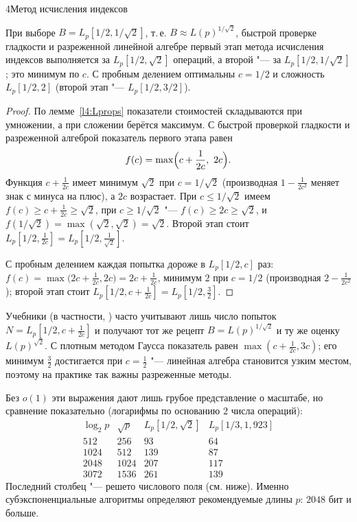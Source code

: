 \begin{lecture}{4}{Метод исчисления индексов}
\begin{theorem}\label{l4:complexity}
При выборе $B = L_p[1/2, 1/\sqrt2]$, т.\,е. $B \approx L(p)^{1/\sqrt 2}$, быстрой проверке
гладкости и разреженной линейной алгебре первый этап метода исчисления индексов выполняется за
$L_p[1/2, \sqrt 2]$ операций, а второй "--- за $L_p[1/2, 1/\sqrt2]$; это минимум по $c$.
С пробным делением оптимальны $c = 1/2$ и сложность $L_p[1/2, 2]$ (второй этап "---
$L_p[1/2, 3/2]$).
\end{theorem}

\begin{proof}
По лемме~\ref{l4:Lprops} показатели стоимостей складываются при умножении, а при сложении берётся
максимум. С быстрой проверкой гладкости и разреженной алгеброй показатель первого этапа равен
\[
  f(c) = \max\Bigl(c + \frac{1}{2c},\ 2c\Bigr).
\]
Функция $c + \frac{1}{2c}$ имеет минимум $\sqrt 2$ при $c = 1/\sqrt 2$ (производная $1 -
\frac{1}{2c^2}$ меняет знак с минуса на плюс), а $2c$ возрастает. При $c \le 1/\sqrt2$ имеем
$f(c) \ge c + \frac{1}{2c} \ge \sqrt2$, при $c \ge 1/\sqrt2$ "--- $f(c) \ge 2c \ge \sqrt 2$,
и $f(1/\sqrt2) = \max(\sqrt2, \sqrt2) = \sqrt 2$. Второй этап стоит $L_p[1/2, \frac{1}{2c}] =
L_p[1/2, \frac{1}{\sqrt2}]$.

С пробным делением каждая попытка дороже в $L_p[1/2, c]$ раз:
$f(c) = \max\bigl(2c + \frac{1}{2c}, 2c\bigr) = 2c + \frac{1}{2c}$, минимум $2$ при $c = 1/2$
(производная $2 - \frac{1}{2c^2}$); второй этап стоит
$L_p[1/2, c + \frac{1}{2c}] = L_p[1/2, \frac32]$.
\end{proof}

\begin{remark}
Учебники (в частности, \cite[разд.~3.8]{hps}) часто учитывают лишь число попыток $N =
L_p[1/2, c + \frac{1}{2c}]$ и получают тот же рецепт $B = L(p)^{1/\sqrt2}$ и ту же оценку
$L(p)^{\sqrt 2}$. С плотным методом Гаусса показатель равен $\max(c + \frac{1}{2c}, 3c)$; его
минимум $\frac32$ достигается при $c = \frac12$ "--- линейная алгебра становится узким местом,
поэтому на практике так важны разреженные методы.
\end{remark}

Без $o(1)$ эти выражения дают лишь грубое представление о масштабе, но сравнение показательно
(логарифмы по основанию $2$ числа операций):
\[
\begin{array}{r|r|r|r}
  \log_2 p & \sqrt{p} & L_p[1/2, \sqrt 2] & L_p[1/3, 1{,}923] \\ \hline
  512 & 256 & 93 & 64 \\
  1024 & 512 & 139 & 87 \\
  2048 & 1024 & 207 & 117 \\
  3072 & 1536 & 261 & 139
\end{array}
\]
Последний столбец "--- решето числового поля (см. ниже). Именно субэкспоненциальные алгоритмы
определяют рекомендуемые длины $p$: $2048$ бит и больше.


\end{lecture}
